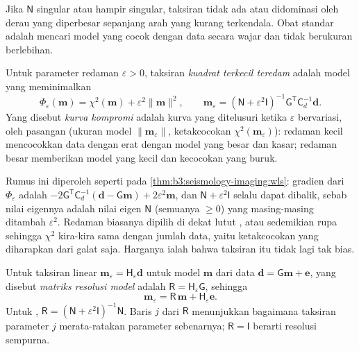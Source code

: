 Jika $\mathsf N$ singular atau hampir singular, taksiran tidak ada atau
didominasi oleh derau yang diperbesar sepanjang arah yang kurang terkendala. Obat
standar adalah mencari model yang cocok dengan data secara wajar dan tidak
berukuran berlebihan.

\begin{definition}\label{def:b3:seismology-imaging:damped}
Untuk parameter redaman $\varepsilon > 0$, taksiran \emph{kuadrat terkecil
teredam} adalah model yang meminimalkan
\[
  \Phi_\varepsilon(\mathbf m) = \chi^2(\mathbf m) + \varepsilon^2\|\mathbf m\|^2 ,
  \qquad
  \mathbf m_\varepsilon = \left(\mathsf N + \varepsilon^2\mathsf I\right)^{-1}
  \mathsf G^{\mathsf T}\mathsf C_d^{-1}\mathbf d .
\]
Yang disebut \emph{kurva kompromi} adalah kurva yang ditelusuri ketika
$\varepsilon$ bervariasi, oleh pasangan (ukuran model $\|\mathbf m_\varepsilon\|$,
ketakcocokan $\chi^2(\mathbf m_\varepsilon)$): redaman kecil mencocokkan data dengan erat
dengan model yang besar dan kasar; redaman besar memberikan model yang kecil dan kecocokan yang buruk.
\end{definition}

Rumus ini diperoleh seperti pada \cref{thm:b3:seismology-imaging:wls}: gradien
dari $\Phi_\varepsilon$ adalah $-2\mathsf G^{\mathsf T}\mathsf C_d^{-1}(\mathbf d -
\mathsf G\mathbf m) + 2\varepsilon^2\mathbf m$, dan $\mathsf N + \varepsilon^2
\mathsf I$ selalu dapat dibalik, sebab nilai eigennya adalah nilai eigen
$\mathsf N$ (semuanya $\ge 0$) yang masing-masing ditambah $\varepsilon^2$. Redaman biasanya
dipilih di dekat lutut , atau sedemikian rupa sehingga $\chi^2$ kira-kira
sama dengan jumlah data, yaitu ketakcocokan yang diharapkan dari galat saja. Harganya ialah bahwa
taksiran itu tidak lagi tak bias.

\begin{definition}\label{def:b3:seismology-imaging:resolution}
Untuk taksiran linear $\mathbf m_\varepsilon = \mathsf H_\varepsilon \mathbf d$
untuk model $\mathbf m$ dari data $\mathbf d = \mathsf G\mathbf m + \mathbf e$,
yang disebut \emph{matriks resolusi model} adalah
$\mathsf R = \mathsf H_\varepsilon\mathsf G$, sehingga
\[
  \mathbf m_\varepsilon = \mathsf R\,\mathbf m + \mathsf H_\varepsilon\mathbf e .
\]
Untuk , $\mathsf R = (\mathsf N + \varepsilon^2\mathsf I)^{-1}
\mathsf N$. Baris $j$ dari $\mathsf R$ menunjukkan bagaimana taksiran parameter $j$
merata-ratakan parameter sebenarnya; $\mathsf R = \mathsf I$ berarti resolusi sempurna.
\end{definition}

